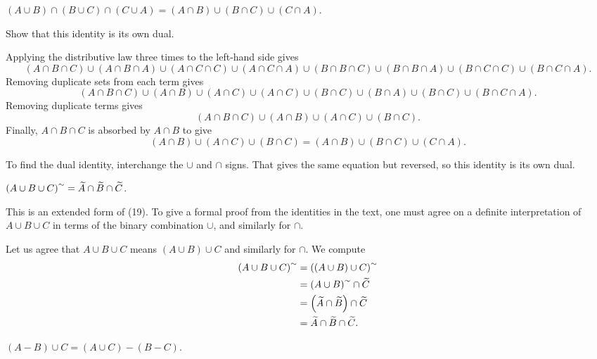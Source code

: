 \documentclass{report}
\begin{document}
\begin{exercise}
$(A\cup B)\cap(B\cup C)\cap(C\cup A) = (A\cap B)\cup(B\cap C)\cup(C\cap A)$.

Show that this identity is its own dual.
\end{exercise}

\begin{solution}
Applying the distributive law three times to the left-hand side gives
\[
    (A\cap B\cap C)\cup(A\cap B\cap A)\cup(A\cap C\cap C)\cup(A\cap C\cap A)
    \cup(B\cap B\cap C)\cup(B\cap B\cap A)\cup(B\cap C\cap C)\cup(B\cap C\cap A).
\]
Removing duplicate sets from each term gives
\[
    (A\cap B\cap C)\cup(A\cap B)\cup(A\cap C)\cup(A\cap C)\cup(B\cap C)\cup(B\cap A)
    \cup(B\cap C)\cup(B\cap C\cap A).
\]
Removing duplicate terms gives
\[(A\cap B\cap C)\cup(A\cap B)\cup(A\cap C)\cup(B\cap C).\]
Finally, $A\cap B\cap C$ is absorbed by $A\cap B$ to give
\[(A\cap B)\cup(A\cap C)\cup(B\cap C) = (A\cap B)\cup(B\cap C)\cup(C\cap A).\]

To find the dual identity, interchange the $\cup$ and $\cap$ signs. That gives
the same equation but reversed, so this identity is its own dual.
\end{solution}

\begin{exercise}
$\left(A\cup B\cup C\right)^{\sim}= \widetilde{A}\cap \widetilde{B}\cap \widetilde{C}$.

This is an extended form of (19). To give a formal proof from the identities in the text,
one must agree on a definite interpretation of $A\cup B\cup C$ in terms of the binary
combination $\cup$, and similarly for $\cap$.
\end{exercise}

\begin{solution} 
Let us agree that $A\cup B\cup C$ means $(A\cup B)\cup C$ and similarly for $\cap$.
We compute
\[
\begin{aligned}
    \left(A\cup B\cup C\right)^{\sim} &= \left((A\cup B)\cup C\right)^{\sim} \\
    &= \left(A\cup B\right)^{\sim} \cap \widetilde{C} \\
    &= \left(\widetilde{A}\cap \widetilde{B}\right) \cap \widetilde{C} \\
    &= \widetilde{A}\cap \widetilde{B} \cap \widetilde{C}.
\end{aligned}
\]
\end{solution}

\begin{exercise}
$(A - B)\cup C = (A\cup C) - (B-C)$.
\end{exercise}
\end{document}
